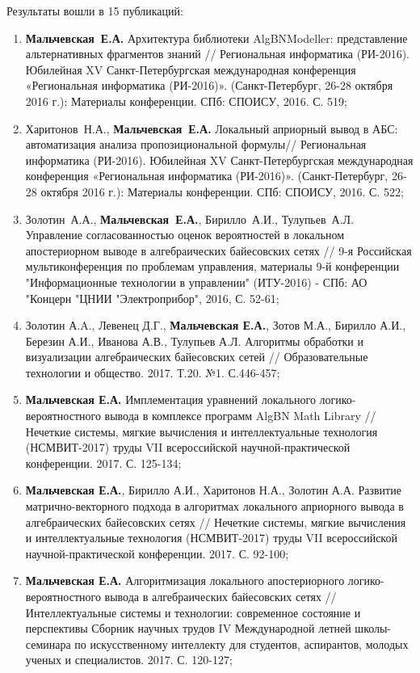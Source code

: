     Результаты вошли в 15 публикаций:
    \begin{enumerate}
        \item	\textbf{Мальчевская~Е.А.} Архитектура библиотеки AlgBNModeller: представление альтернативных фрагментов знаний // Региональная информатика (РИ-2016). Юбилейная XV Санкт-Петербургская международная конференция «Региональная информатика (РИ-2016)». (Санкт-Петербург, 26-28 октября 2016 г.): Материалы конференции. СПб: СПОИСУ, 2016. С. 519;
		\item	Харитонов~Н.А., \textbf{Мальчевская~Е.А.}  Локальный априорный вывод в АБС: автоматизация анализа пропозициональной формулы// Региональная информатика (РИ-2016). Юбилейная XV Санкт-Петербургская международная конференция «Региональная информатика (РИ-2016)». (Санкт-Петербург, 26-28 октября 2016 г.): Материалы конференции. СПб: СПОИСУ, 2016. С. 522;
		\item	Золотин~А.А., \textbf{Мальчевская~Е.А.}, Бирилло~А.И., Тулупьев~А.Л. Управление согласованностью оценок вероятностей в локальном апостериорном выводе в алгебраических байесовских сетях // 9-я Российская мультиконференция по проблемам управления, материалы 9-й конференции "Информационные технологии в управлении" (ИТУ-2016) - СПб: АО "Концерн "ЦНИИ "Электроприбор", 2016, С. 52-61;
        \item Золотин А.A., Левенец Д.Г., \textbf{Мальчевская Е.А.}, Зотов М.А., Бирилло А.И., Березин А.И., Иванова А.В., Тулупьев А.Л. Алгоритмы обработки и визуализации алгебраических байесовских сетей // Образовательные технологии и общество. 2017. Т.20. №1. С.446-457;
        \item	\textbf{Мальчевская Е.А.} Имплементация уравнений локального логико- вероятностного вывода в комплексе программ AlgBN Math Library //  Нечеткие системы, мягкие вычисления и интеллектуальные технология (НСМВИТ-2017) труды VII всероссийской научной-практической конференции. 2017. С. 125-134;
        \item	\textbf{Мальчевская Е.А.}, Бирилло А.И., Харитонов Н.А., Золотин А.А. Развитие матрично-векторного подхода в алгоритмах локального априорного вывода в алгебраических байесовских сетях // Нечеткие системы, мягкие вычисления и интеллектуальные технология (НСМВИТ-2017) труды VII всероссийской научной-практической конференции. 2017. С. 92-100; 
        \item	\textbf{Мальчевская Е.А.} Алгоритмизация локального апостериорного логико-вероятностного вывода в алгебраических байесовских сетях // Интеллектуальные системы и технологии: современное состояние и перспективы Сборник научных трудов IV Международной летней школы-семинара по искусственному интеллекту для студентов, аспирантов, молодых ученых и специалистов. 2017. С. 120-127;

\end{enumerate}
